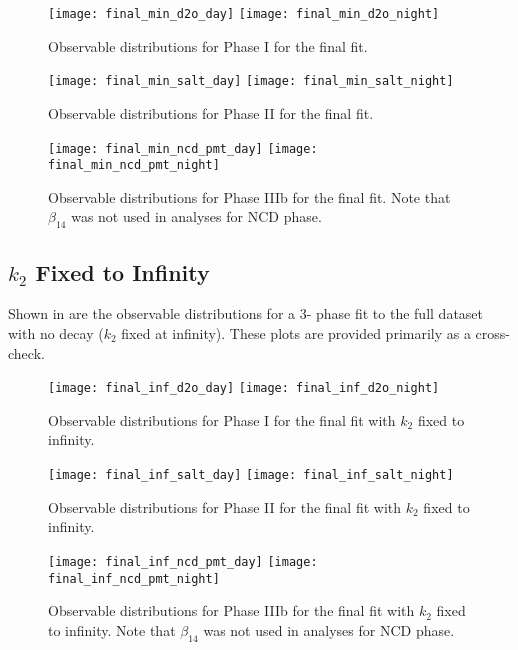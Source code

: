 \begin{figure}
\centering
\texttt{[image: final\_min\_d2o\_day]}
\texttt{[image: final\_min\_d2o\_night]}
\caption{\label{fig:final_d2o_obs}Observable distributions for Phase I for the final fit.}
\end{figure}
\begin{figure}
\centering
\texttt{[image: final\_min\_salt\_day]}
\texttt{[image: final\_min\_salt\_night]}
\caption{\label{fig:final_salt_obs}Observable distributions for Phase II for the final fit.}
\end{figure}
\begin{figure}
\centering
\texttt{[image: final\_min\_ncd\_pmt\_day]}
\texttt{[image: final\_min\_ncd\_pmt\_night]}
\caption{\label{fig:final_ncd_pmt_obs}Observable distributions for Phase IIIb for the final fit. Note that $\beta_{14}$ was not used in analyses for NCD phase.}
\end{figure}

\clearpage

\subsection{\texorpdfstring{$k_2$}{k2} Fixed to Infinity}

Shown in  are the observable distributions for a 3-    phase fit to the full dataset with no decay ($k_2$ fixed at infinity). These plots are provided primarily as a cross-check.

\begin{figure}
\centering
\texttt{[image: final\_inf\_d2o\_day]}
\texttt{[image: final\_inf\_d2o\_night]}
\caption{\label{fig:final_inf_d2o_obs}Observable distributions for Phase I for the final fit with $k_2$ fixed to infinity.}
\end{figure}
\begin{figure}
\centering
\texttt{[image: final\_inf\_salt\_day]}
\texttt{[image: final\_inf\_salt\_night]}
\caption{\label{fig:final_inf_salt_obs}Observable distributions for Phase II for the final fit with $k_2$ fixed to infinity.}
\end{figure}
\begin{figure}
\centering
\texttt{[image: final\_inf\_ncd\_pmt\_day]}
\texttt{[image: final\_inf\_ncd\_pmt\_night]}
\caption{\label{fig:final_inf_ncd_pmt_obs}Observable distributions for Phase IIIb for the final fit with $k_2$ fixed to infinity. Note that $\beta_{14}$ was not used in analyses for NCD phase.}
\end{figure}
